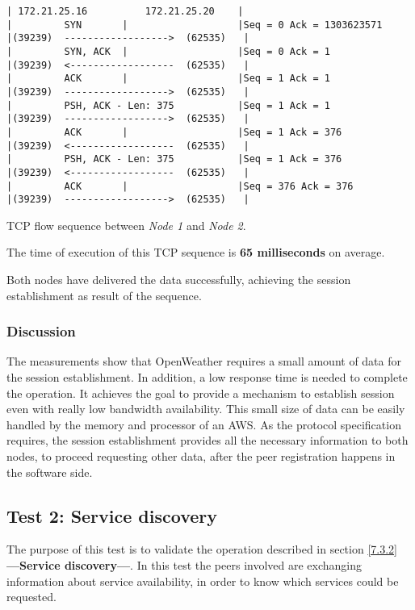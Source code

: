 \begin{table}[H]
\begin{minipage}[t]{\linewidth}
\begin{verbatim}
| 172.21.25.16          172.21.25.20    |               
|         SYN       |                   |Seq = 0 Ack = 1303623571
|(39239)  ------------------>  (62535)   |
|         SYN, ACK  |                   |Seq = 0 Ack = 1
|(39239)  <------------------  (62535)   |
|         ACK       |                   |Seq = 1 Ack = 1
|(39239)  ------------------>  (62535)   |
|         PSH, ACK - Len: 375           |Seq = 1 Ack = 1
|(39239)  ------------------>  (62535)   |
|         ACK       |                   |Seq = 1 Ack = 376
|(39239)  <------------------  (62535)   |
|         PSH, ACK - Len: 375           |Seq = 1 Ack = 376
|(39239)  <------------------  (62535)   |
|         ACK       |                   |Seq = 376 Ack = 376
|(39239)  ------------------>  (62535)   |
\end{verbatim}
\end{minipage}
\caption{\protect \gls{TCP} flow sequence between \emph{Node 1} and \emph{Node 2}.}
\end{table}
The time of execution of this \gls{TCP} sequence is \textbf{65 milliseconds} on average.

Both nodes have delivered the data successfully, achieving the session establishment as result of the sequence. 

\subsubsection{Discussion}

The measurements show that OpenWeather requires a small amount of data for the session establishment. In addition, a low response time is needed to complete the operation. It achieves the goal to provide a mechanism to establish session even with really low bandwidth availability. This small size of data can be easily handled by the memory and processor of an \gls{AWS}. As the protocol specification requires, the session establishment provides all the necessary information to both nodes, to proceed requesting other data, after the peer registration happens in the software side.

\subsection{Test 2: Service discovery}

The purpose of this test is to validate the operation described in section \ref{7.3.2} \textbf{—Service discovery—}. In this test the peers involved are exchanging information about service availability, in order to know which services could be requested.

